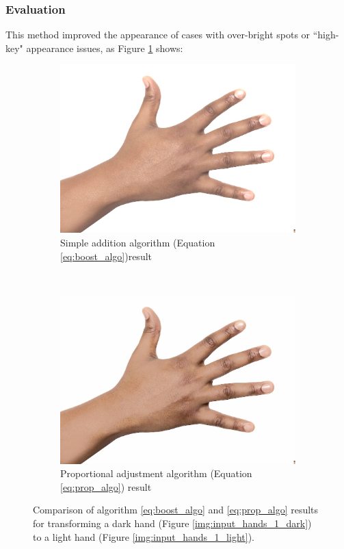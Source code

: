 \subsubsection*{Evaluation}
This method improved the appearance of cases with over-bright spots or ``high-key" appearance issues, as Figure \ref{img:compare_bright_spot} shows:
\begin{figure}[H]
    \centering
    \begin{subfigure}[b]{0.40\textwidth}
        \includegraphics[width=\textwidth]{../rc_test/outputs/20170516_boost_test/hand_dark_to_hand_light.jpg}
        \caption{Simple addition algorithm (Equation \ref{eq:boost_algo})result}
    \end{subfigure}
    ~
    \begin{subfigure}[b]{0.40\textwidth}
        \includegraphics[width=\textwidth]{../rc_test/outputs/20170516_proportional_test/hand_dark_to_hand_light.jpg}
        \caption{Proportional adjustment algorithm (Equation \ref{eq:prop_algo}) result}
    \end{subfigure}
    \caption{Comparison of algorithm \ref{eq:boost_algo} and \ref{eq:prop_algo} results for transforming a dark hand (Figure \ref{img:input_hands_1_dark}) to a light hand (Figure \ref{img:input_hands_1_light}).\label{img:compare_bright_spot}}
\end{figure}

